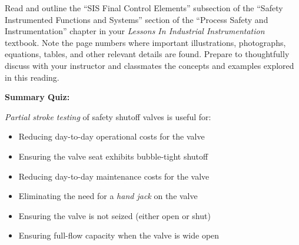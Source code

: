 

Read and outline the ``SIS Final Control Elements'' subsection of the ``Safety Instrumented Functions and Systems'' section of the ``Process Safety and Instrumentation'' chapter in your {\it Lessons In Industrial Instrumentation} textbook.  Note the page numbers where important illustrations, photographs, equations, tables, and other relevant details are found.  Prepare to thoughtfully discuss with your instructor and classmates the concepts and examples explored in this reading.















\vfil \eject

\noindent
{\bf Summary Quiz:}

{\it Partial stroke testing} of safety shutoff valves is useful for:

\begin{itemize}
\item{} Reducing day-to-day operational costs for the valve
\vskip 5pt 
\item{} Ensuring the valve seat exhibits bubble-tight shutoff
\vskip 5pt 
\item{} Reducing day-to-day maintenance costs for the valve
\vskip 5pt 
\item{} Eliminating the need for a {\it hand jack} on the valve
\vskip 5pt 
\item{} Ensuring the valve is not seized (either open or shut)
\vskip 5pt 
\item{} Ensuring full-flow capacity when the valve is wide open
\end{itemize}




